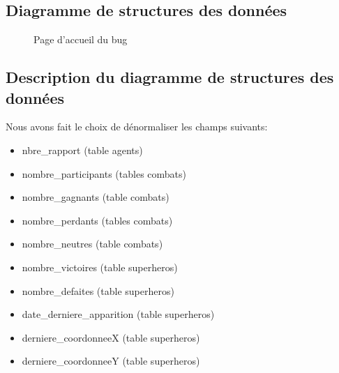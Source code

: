 \documentclass{article}[12pt]
\begin{document}
	\subsection{Diagramme de structures des données}
	\begin{figure}[H]
		\centering
		\caption{Page d'accueil du bug}
	\end{figure}
	\subsection{Description du diagramme de structures des données}
	\label{dsd}
	Nous avons fait le choix de dénormaliser les champs suivants: 
	\begin{itemize}
		\item nbre\_rapport (table agents)
		\item nombre\_participants (tables combats)
		\item nombre\_gagnants (table combats)
		\item nombre\_perdants (tables combats)
		\item nombre\_neutres (table combats)
		\item nombre\_victoires (table superheros)
		\item nombre\_defaites (table superheros)
		\item date\_derniere\_apparition (table superheros)
		\item derniere\_coordonneeX (table superheros) 	
		\item derniere\_coordonneeY (table superheros) 	
	\end{itemize}
\end{document}

